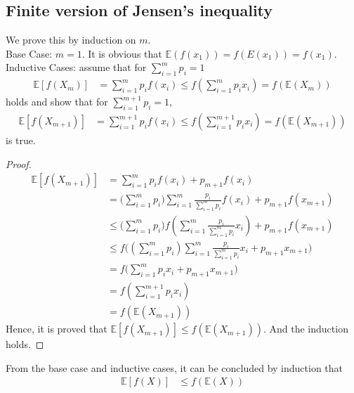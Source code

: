 \documentclass[11pt,a4paper]{article}
\begin{document}
\subsection{Finite version of Jensen's inequality}
\newcommand{\E}{\mathbb{E}}
We prove this by induction on $m$.   \\
Base Case: $m = 1$. It is obvious that $\E(f(x_1)) = f(E(x_1)) = f(x_1)$. \\
Inductive Cases: assume that for $\sum_{i=1}^m p_i = 1$
\begin{align}
    \E[f(X_m)] &= \sum_{i=1}^m p_i f(x_i) \leq f(\sum_{i=1}^m p_i x_i) = f(\E(X_{m}))
\end{align}
holds and show that for $\sum_{i=1}^{m+1} p_i = 1$, 
\begin{align}
    \E[f(X_{m+1})] &= \sum_{i=1}^{m+1} p_i f(x_i) 
    \leq f(\sum_{i=1}^{m+1} p_i x_i) = f(\E(X_{m+1}))
\end{align}
is true.
\begin{proof}
    \begin{align}
        \E[f(X_{m+1})] &= \sum_{i=1}^{m} p_i f(x_i) + p_{m+1} f(x_i)  \\
        &= \big(\sum_{i=1}^{m} p_i \big) \sum_{i=1}^{m}
        \frac{p_i}{\sum_{i=1}^{m} p_i} f(x_i) + p_{m+1} f(x_{m+1})  \\
        &\leq \big(\sum_{i=1}^{m} p_i \big) f(\sum_{i=1}^{m}
        \frac{p_i}{\sum_{i=1}^{m} p_i} x_i) + p_{m+1} f(x_{m+1})  \\
        &\leq f \big( (\sum_{i=1}^{m} p_i) \sum_{i=1}^{m}
        \frac{p_i}{\sum_{i=1}^{m} p_i} x_i + p_{m+1} x_{m+1} \big) \\
        &= f \big( \sum_{i=1}^{m} p_i x_i + p_{m+1} x_{m+1} \big) \\
        &= f(\sum_{i=1}^{m+1} p_i x_i) \\
        &= f(\E(X_{m+1}))
    \end{align}
    Hence, it is proved that $\E[f(X_{m+1})] \leq f(\E(X_{m+1}))$. And the
    induction holds. 
\end{proof}
\noindent
From the base case and inductive cases, it can be concluded by induction that 
\begin{align}
    \E[f(X)] &  \leq f(\E(X))
\end{align}


\newpage
\end{document}

